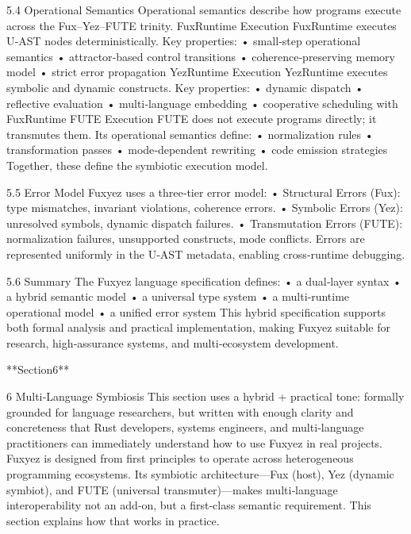 5.4 Operational Semantics
Operational semantics describe how programs execute across the Fux–Yez–FUTE trinity.
FuxRuntime Execution
FuxRuntime executes U‑AST nodes deterministically.
Key properties:
• 	small‑step operational semantics
• 	attractor‑based control transitions
• 	coherence‑preserving memory model
• 	strict error propagation
YezRuntime Execution
YezRuntime executes symbolic and dynamic constructs.
Key properties:
• 	dynamic dispatch
• 	reflective evaluation
• 	multi‑language embedding
• 	cooperative scheduling with FuxRuntime
FUTE Execution
FUTE does not execute programs directly; it transmutes them.
Its operational semantics define:
• 	normalization rules
• 	transformation passes
• 	mode‑dependent rewriting
• 	code emission strategies
Together, these define the symbiotic execution model.

5.5 Error Model
Fuxyez uses a three‑tier error model:
• 	Structural Errors (Fux): type mismatches, invariant violations, coherence errors.
• 	Symbolic Errors (Yez): unresolved symbols, dynamic dispatch failures.
• 	Transmutation Errors (FUTE): normalization failures, unsupported constructs, mode conflicts.
Errors are represented uniformly in the U‑AST metadata, enabling cross‑runtime debugging.

5.6 Summary
The Fuxyez language specification defines:
• 	a dual‑layer syntax
• 	a hybrid semantic model
• 	a universal type system
• 	a multi‑runtime operational model
• 	a unified error system
This hybrid specification supports both formal analysis and practical implementation, making Fuxyez suitable for research, high‑assurance systems, and multi‑ecosystem development.

**Section6**

6 Multi‑Language Symbiosis
This section uses a hybrid + practical tone: formally grounded for language researchers, but written with enough clarity and concreteness that Rust developers, systems engineers, and multi‑language practitioners can immediately understand how to use Fuxyez in real projects.
Fuxyez is designed from first principles to operate across heterogeneous programming ecosystems. Its symbiotic architecture—Fux (host), Yez (dynamic symbiot), and FUTE (universal transmuter)—makes multi‑language interoperability not an add‑on, but a first‑class semantic requirement. This section explains how that works in practice.

